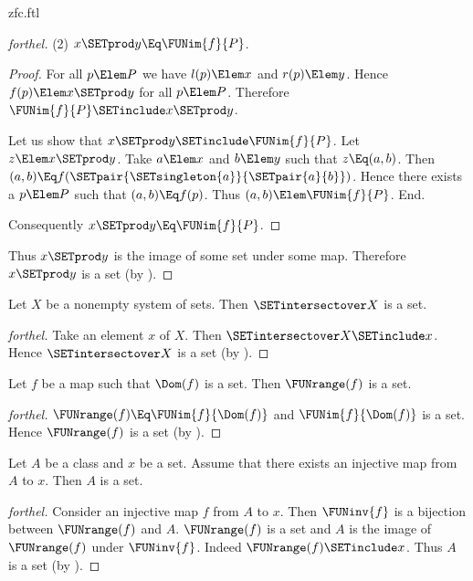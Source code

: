\documentclass{stex}
\begin{document}
\begin{smodule}{zfc.ftl}
\begin{proof}[forthel]
  (2) $x \SETprod y \Eq \FUNim{f}{P}$.
  \begin{proof}
    For all $p \Elem P$ we have $l(p) \Elem x$ and $r(p) \Elem y$.
    Hence $f(p) \Elem x \SETprod y$ for all $p \Elem P$.
    Therefore $\FUNim{f}{P} \SETinclude x \SETprod y$.

    Let us show that $x \SETprod y \SETinclude \FUNim{f}{P}$.
      Let $z \Elem x \SETprod y$.
      Take $a \Elem x$ and $b \Elem y$ such that $z \Eq (a,b)$.
      Then $(a,b) \Eq f(\SETpair{\SETsingleton{a}}{\SETpair{a}{b}})$.
      Hence there exists a $p \Elem P$ such that $(a,b) \Eq f(p)$.
      Thus $(a,b) \Elem \FUNim{f}{P}$.
    End.

    Consequently $x \SETprod y \Eq \FUNim{f}{P}$.
  \end{proof}

  Thus $x \SETprod y$ is the image of some set under some map.
  Therefore $x \SETprod y$ is a set (by ).
\end{proof}

\begin{proposition}[forthel,id=FOUNDATIONS_10_5486815207227392]
  Let $X$ be a nonempty system of sets.
  Then $\SETintersectover X$ is a set.
\end{proposition}
\begin{proof}[forthel]
  Take an element $x$ of $X$.
  Then $\SETintersectover X \SETinclude x$.
  Hence $\SETintersectover X$ is a set (by ).
\end{proof}

\begin{proposition}[forthel,id=FOUNDATIONS_10_7598384349184000]
  Let $f$ be a map such that $\Dom(f)$ is a set.
  Then $\FUNrange(f)$ is a set.
\end{proposition}
\begin{proof}[forthel]
  $\FUNrange(f) \Eq \FUNim{f}{\Dom(f)}$ and $\FUNim{f}{\Dom(f)}$ is a set.
  Hence $\FUNrange(f)$ is a set (by ).
\end{proof}

\begin{proposition}[forthel,id=FOUNDATIONS_10_8631339572002816]
  Let $A$ be a class and $x$ be a set.
  Assume that there exists an injective map from $A$ to $x$.
  Then $A$ is a set.
\end{proposition}
\begin{proof}[forthel]
  Consider an injective map $f$ from $A$ to $x$.
  Then $\FUNinv{f}$ is a bijection between $\FUNrange(f)$ and $A$.
  $\FUNrange(f)$ is a set and $A$ is the image of $\FUNrange(f)$ under $\FUNinv{f}$.
  Indeed $\FUNrange(f) \SETinclude x$.
  Thus $A$ is a set (by ).
\end{proof}


\end{smodule}
\end{document}
